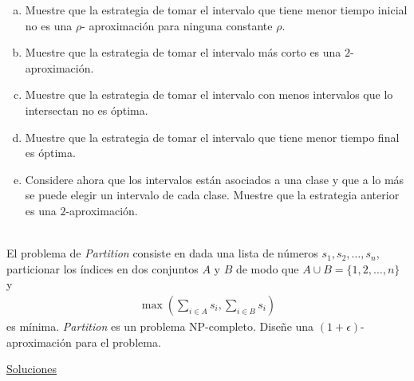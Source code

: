 \documentclass[dcc,uchile]{fcfmcourse}
\theoremstyle{plain}
\theoremstyle{definition}
\begin{document}
\begin{problems}
\begin{enumerate}[a)]
\item Muestre que la estrategia de tomar el intervalo que tiene menor tiempo inicial no es una $\rho$- aproximación para ninguna constante $\rho$.
\item Muestre que la estrategia de tomar el intervalo más corto es una $2$-aproximación.
\item Muestre que la estrategia de tomar el intervalo con menos intervalos que lo intersectan no es óptima.
\item Muestre que la estrategia de tomar el intervalo que tiene menor tiempo final es óptima.
\item Considere ahora que los intervalos están asociados a una clase y que a lo más se puede elegir un intervalo de cada clase. Muestre que la estrategia anterior es una $2$-aproximación.
\end{enumerate}

\\
El problema de \textit{Partition} consiste en dada una lista de números $s_{1}, s_{2}, \ldots, s_{n}$, particionar los índices en dos conjuntos $A$ y $B$ de modo que $A \cup B = \{1, 2, \ldots, n\}$ y 
\begin{align*}
    \max{\left(\sum_{i\in A}s_{i}, \sum_{i\in B}s_{i}\right)}
\end{align*}
es mínima. \textit{Partition} es un problema NP-completo. Diseñe una $(1+\epsilon)$- aproximación para el problema.

\end{problems}
\newpage
\begin{center}
{\huge \underline{Soluciones}}
\end{center}
\end{document}
